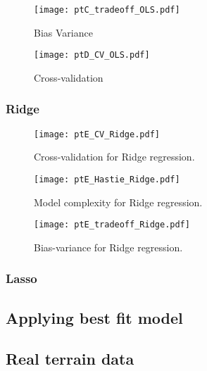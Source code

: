             \begin{figure}
                \texttt{[image: ptC\_tradeoff\_OLS.pdf]}
                \caption{Bias Variance}
                \label{fig:bias_variance_ols}
            \end{figure}


            \begin{figure}
                \texttt{[image: ptD\_CV\_OLS.pdf]}
                \caption{Cross-validation}
                \label{fig:cross-validation_ols}
            \end{figure}



        

        \subsubsection{Ridge}\label{sec:rigdeanalysis}

        \begin{figure}
            \texttt{[image: ptE\_CV\_Ridge.pdf]}
            \caption{Cross-validation for Ridge regression.}
            \label{eq:cross-validation_ridge}
        \end{figure}

        \begin{figure}
            \texttt{[image: ptE\_Hastie\_Ridge.pdf]}
            \caption{Model complexity for Ridge regression.}
            \label{eq:model_complexity_ridge}
        \end{figure}

        \begin{figure}
            \texttt{[image: ptE\_tradeoff\_Ridge.pdf]}
            \caption{Bias-variance for Ridge regression.}
            \label{eq:bias_variance_ridge}
        \end{figure}

        \subsubsection{Lasso}\label{sec:lassoanalysis}

    \subsection{Applying best fit model}\label{sec:applybestmodel}

    \subsection{Real terrain data}\label{sec:realdata}